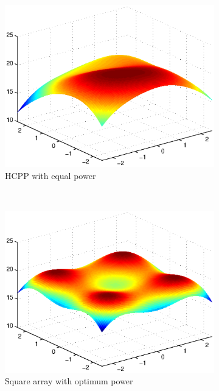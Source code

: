 \documentclass[slidestop,usepdftitle=false]{gvvslides}
\begin{document}
\begin{frame}
\begin{figure}[!]
\begin{subfigure}{0.3\columnwidth}
\includegraphics[width=\columnwidth]{c4_hcpp_SNR_Eq}
\caption{HCPP with equal power}
\end{subfigure}
\\
\begin{subfigure}{0.3\columnwidth}
\includegraphics[width=\columnwidth]{c4_sqArr_SNR_opt}
\caption{Square array with optimum power}
\end{subfigure}~
\begin{subfigure}{0.3\columnwidth}

\end{subfigure}
\end{figure}
\end{frame}
\end{document}
